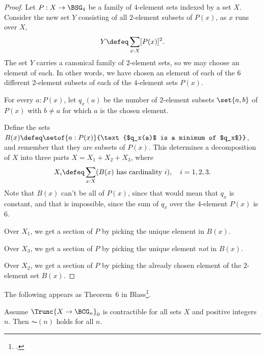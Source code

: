 \begin{proof}
  Let $P: X \to \BSG_4$ be a family of $4$-element sets indexed by a set $X$.
  Consider the new set $Y$ consisting of all $2$-element subsets
  of $P(x)$, as $x$ runs over $X$,
  \[
    Y \defeq \sum_{x:X}[P(x)]^2.
  \]
  The set $Y$ carries a canonical family of $2$-element sets,
  so we may choose an element of each.
  In other words, we have chosen an element of each of the $6$
  different $2$-element subsets of each of the $4$-element sets
  $P(x)$.

  For every $a : P(x)$, let $q_x(a)$ be the number of $2$-element
  subsets $\set{a,b}$ of $P(x)$ with $b\ne a$ for which $a$ is the
  chosen element.

  Define the sets $B(x) \defeq \setof{a:P(x)}{\text{$q_x(a)$ is a
      minimum of $q_x$}}$, and remember that they are subsets of $P(x)$.
  This determines a decomposition of $X$ into three parts $X = X_1 +
  X_2 + X_3$, where
  \[
    X_i \defeq \sum_{x:X}(\text{$B(x)$ has cardinality $i$}),
    \quad i = 1,2,3.
  \]
  Note that $B(x)$ can't be all of $P(x)$,
  since that would mean that $q_x$ is constant,
  and that is impossible, since the sum of $q_x$ over the $4$-element $P(x)$ is $6$.

  Over $X_1$, we get a section of $P$ by picking the unique element
  in $B(x)$.

  Over $X_3$, we get a section of $P$ by picking the unique element
  \emph{not} in $B(x)$.

  Over $X_2$, we get a section of $P$ by picking the already chosen
  element of the $2$-element set $B(x)$.
\end{proof}

The following appears as Theorem~6 in Blass\footcite{Blass-Finite-Choice}.
\begin{theorem}
  Assume $\Trunc{X \to \BCG_n}_0$ is contractible for all sets $X$ and
  positive integers $n$. Then $\AC(n)$ holds for all $n$.
\end{theorem}

